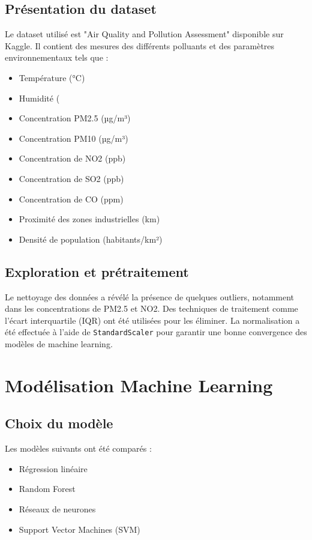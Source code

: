 \documentclass[12pt]{article}
\begin{document}
\subsection{Présentation du dataset}
Le dataset utilisé est "Air Quality and Pollution Assessment" disponible sur Kaggle. Il contient des mesures des différents polluants et des paramètres environnementaux tels que :
\begin{itemize}
    \item Température (°C)
    \item Humidité (%
    \item Concentration PM2.5 (µg/m³)
    \item Concentration PM10 (µg/m³)
    \item Concentration de NO2 (ppb)
    \item Concentration de SO2 (ppb)
    \item Concentration de CO (ppm)
    \item Proximité des zones industrielles (km)
    \item Densité de population (habitants/km²)
\end{itemize}

\subsection{Exploration et prétraitement}
Le nettoyage des données a révélé la présence de quelques outliers, notamment dans les concentrations de PM2.5 et NO2. Des techniques de traitement comme l'écart interquartile (IQR) ont été utilisées pour les éliminer. La normalisation a été effectuée à l'aide de \texttt{StandardScaler} pour garantir une bonne convergence des modèles de machine learning.

\section{Modélisation Machine Learning}
\subsection{Choix du modèle}
Les modèles suivants ont été comparés :
\begin{itemize}
    \item Régression linéaire
    \item Random Forest
    \item Réseaux de neurones
    \item Support Vector Machines (SVM)
\end{itemize}
\end{document}

